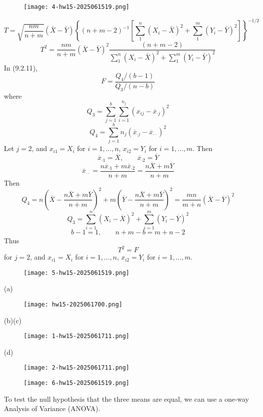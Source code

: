 \begin{exercise}
\begin{figure}[H]
\centering
\texttt{[image: 4-hw15-2025061519.png]}
\label{}
\end{figure}
\end{exercise}
\[
T=\sqrt{\frac{n m}{n+m}}(\bar{X}-\bar{Y})\left\{(n+m-2)^{-1}\left[\sum_1^n\left(X_i-\bar{X}\right)^2+\sum_1^m\left(Y_i-\bar{Y}\right)^2\right]\right\}^{-1 / 2}
\]
\[
T^2=\frac{n m}{n+m}(\bar{X}-\bar{Y})^2 \frac{(n+m-2)}{\sum_1^n\left(X_i-\bar{X}\right)^2+\sum_1^m\left(Y_i-\bar{Y}\right)^2}
\]
In (9.2.11),
\[
F=\frac{Q_4/(b-1)}{Q_3/(n-b)}
\]
where
\[
Q_3=\sum_{j=1}^{b} \sum_{i=1}^{n_j} (x_{ij}-\overline{x}_{\cdot j})^{2}
\]
\[
Q_4=\sum_{j=1}^{b} n_j(\overline{x}_{\cdot j}-\overline{x}_{\cdot \cdot })^{2}
\]
Let $j=2$, and $x_{i 1}=X_i$ for $i=1,\dots,n$, $x_{i 2}=Y_i$ for $i=1,\dots,m$. Then
\[
\overline{x}_{\cdot1}=\overline{X},\qquad \overline{x}_{\cdot 2}=\overline{Y}
\]
\[
\overline{x}_{\cdot \cdot }=\frac{n\overline{x}_{\cdot 1}+m\overline{x}_{\cdot 2}}{n+m}=\frac{n\overline{X}+m\overline{Y}}{n+m}
\]
Then
\[
Q_4=n\left( \overline{X}-\frac{n\overline{X}+m\overline{Y}}{n+m} \right)^{2}+m\left( \overline{Y}-\frac{n\overline{X}+m\overline{Y}}{n+m} \right)^{2}=\frac{mn}{m+n}(\overline{X}-\overline{Y})^{2}
\]
\[
Q_3=\sum_{i=1}^{n} (X_i-\overline{X})^{2}+\sum_{i=1}^{m} (Y_i-\overline{Y})^{2}
\]
\[
b-1=1,\qquad n+m-b=m+n-2
\]
Thus
\[
T^{2}=F
\]
for $j=2$, and $x_{i 1}=X_i$ for $i=1,\dots,n$, $x_{i 2}=Y_i$ for $i=1,\dots,m$.

\begin{exercise}
\begin{figure}[H]
\centering
\texttt{[image: 5-hw15-2025061519.png]}
\label{}
\end{figure}
\end{exercise}
(a)
\begin{figure}[H]
\centering
\texttt{[image: hw15-2025061700.png]}
\label{}
\end{figure}
(b)(c)
\begin{figure}[H]
\centering
\texttt{[image: 1-hw15-2025061711.png]}
\label{}
\end{figure}
(d)
\begin{figure}[H]
\centering
\texttt{[image: 2-hw15-2025061711.png]}
\label{}
\end{figure}

\begin{exercise}
\begin{figure}[H]
\centering
\texttt{[image: 6-hw15-2025061519.png]}
\label{}
\end{figure}
\end{exercise}
To test the null hypothesis that the three means are equal, we can use a one-way Analysis of Variance (ANOVA).

